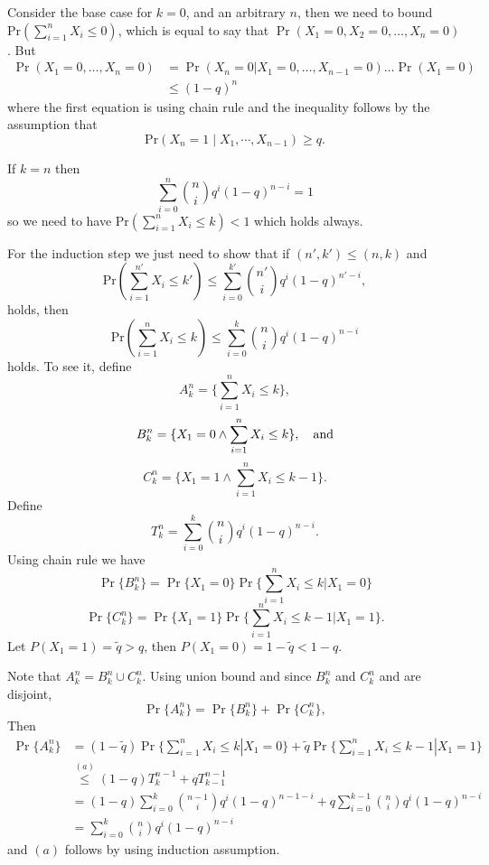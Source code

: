 \documentclass[conference,a4paper]{article}
\begin{document}
Consider the base case for $k=0$, and an arbitrary $n$, then we need to bound $\mathrm{Pr}\left(\sum_{i=1}^nX_i\le 0\right)$, which is equal to say that  $\Pr(X_1=0,X_2=0,\dots,X_n=0)$. But
\begin{align*}
\Pr(X_1=0,\dots,X_n=0)
&=\Pr(X_n=0|X_1=0,\dots,X_{n-1}=0)\dots\Pr(X_1=0)\\
&\leq(1-q)^n
\end{align*}
where the first equation is using chain rule and the inequality follows by the assumption that 
\[
\mathrm{Pr}\left(X_n=1\mid X_1,\cdots,X_{n-1}\right)\ge q.
\]

If $k= n$ then
\[
\sum_{i=0}^{n}\binom{n}{i}q^i(1-q)^{n-i}=1
\]
so we need to have $\mathrm{Pr}\left(\sum_{i=1}^nX_i\le k\right)<1$ which holds always.

For the induction step we just need to show that if $(n',k')\leq (n,k)$ and
$$\mathrm{Pr}\left(\sum_{i=1}^{n'}X_i\le k'\right)\le \sum_{i=0}^{k'}\binom{n'}{i}q^i(1-q)^{n'-i},$$ 
holds, then 
 $$\mathrm{Pr}\left(\sum_{i=1}^nX_i\le k\right)\le \sum_{i=0}^{k}\binom{n}{i}q^i(1-q)^{n-i}$$
 holds. 
To see it, define 
$$A_k^n= \{\sum_{i=1}^nX_i\leq k\},$$
$$B_k^n=\{X_1=0 \wedge \sum_{i=1}^nX_i\leq k\},\text{\quad and}$$
$$C_k^n=\{X_1=1\wedge \sum_{i=1}^nX_i\leq k-1\}.$$
Define 
\[
T_k^n=\sum_{i=0}^k \binom{n}{i}q^i(1-q)^{n-i}.
\]
Using chain rule we have 
\[
\Pr\{B_k^n\}=\Pr\{X_1=0\}\Pr\{\sum_{i=1}^nX_i\leq k|X_1=0\}\]
\[
\Pr\{C_k^n\}=\Pr\{X_1=1\}\Pr\{\sum_{i=1}^nX_i\leq k-1|X_1=1\}.
\]
Let $P(X_1=1)=\tilde{q}>q$, then $P(X_1=0)=1-\tilde{q}<1-q$. 

Note that $A_k^n=B_k^n\cup C_k^n$. Using union bound and since $B_k^n$ and $C_k^n$ and are disjoint, 
\[
\Pr\{A_k^n\}=\Pr\{B_k^n\}+\Pr\{C_k^n\},
\]
Then 
\begin{align*}
\Pr\{A_k^n\}
&=(1-\tilde{q})\Pr\{\sum_{i=1}^nX_i\leq k|X_1=0\}+\tilde{q}\Pr\{\sum_{i=1}^nX_i\leq k-1|X_1=1\}\\
&\overset{(a)}{\leq} (1-q)T_{k}^{n-1}+qT_{k-1}^{n-1}\\
&=(1-q)\sum_{i=0}^{k}\binom{n-1}{i}q^i(1-q)^{n-1-i}
+q\sum_{i=0}^{k-1}\binom{n}{i}q^i(1-q)^{n-i}\\
&=\sum_{i=0}^{k}\binom{n}{i}q^i(1-q)^{n-i}
\end{align*}
and $(a)$ follows by using induction assumption. 

\eLemma
\end{document}
